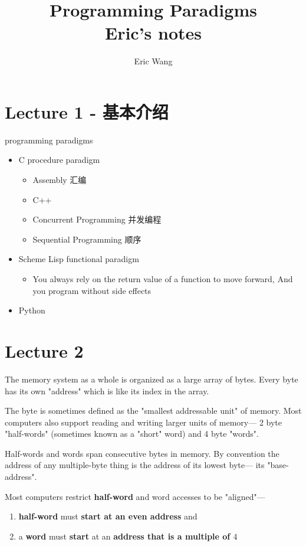 \documentclass{article}
\begin{document}
\title{Programming Paradigms\\ Eric's notes}
\author{Eric Wang}
\maketitle
\newpage
\tableofcontents
\newpage

\section{Lecture 1 - 基本介绍}
programming paradigms
\begin{itemize}
\item C procedure paradigm
	\begin{itemize}
	\item Assembly 汇编
	\item C++
	\item Concurrent Programming 并发编程
	\item Sequential Programming 顺序
	\end{itemize}

\item Scheme Lisp functional paradigm
	\begin{itemize}
	\item You always rely on the return value of a function to move forward, And you program without side effects
	\end{itemize}

\item Python
\end{itemize}

\section{Lecture 2}
The memory system as a whole is organized as a large array of bytes. 
Every byte has its own "address" which is like its index in the array.

The byte is sometimes defined as the "smallest addressable unit" of memory. 
Most computers also support reading and writing larger units of memory— 2 byte "half-words" (sometimes known as a "short" word) and 4 byte "words".

Half-words and words span consecutive bytes in memory. By convention the address of any multiple-byte thing is the address of its lowest byte— its "base-address".

Most computers restrict \textbf{half-word} and word accesses to be "aligned"—
\begin{enumerate}
\item \textbf{half-word} must \textbf{start at an even address} and
\item a \textbf{word} must \textbf{start} at an \textbf{address that is a multiple of $4$}
\end{enumerate}
\end{document}
